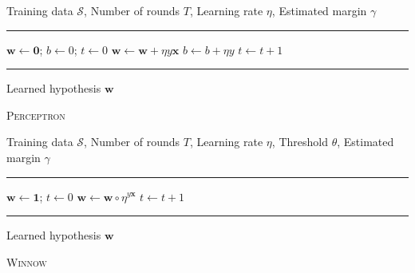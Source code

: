 \documentclass[12pt,letterpaper]{article}
\begin{document}
\begin{enumerate}
\begin{algorithm}[h]
\begin{algorithmic}
    Training data $\mathcal{S}$, Number of rounds $T$, Learning rate $\eta$, Estimated margin $\gamma$
   \vspace{0.5em}
   \hrule
   \vspace{0.5em}
   \STATE $\mathbf{w} \leftarrow \mathbf{0}$; $b \leftarrow 0$; $t \leftarrow 0$
            \STATE $\mathbf{w} \leftarrow \mathbf{w} + \eta y \mathbf{x}$
            \STATE $b \leftarrow b + \eta y$
         \ENDIF
      \ENDFOR
      \STATE $t \leftarrow t + 1$
   \ENDWHILE
   \vspace{0.5em}
   \hrule
   \vspace{0.5em}
    Learned hypothesis $\mathbf{w}$ 
\caption{\textsc{Perceptron}}
\end{algorithmic}
\end{algorithm}

\begin{algorithm}[h]
\begin{algorithmic}
    Training data $\mathcal{S}$, Number of rounds $T$, Learning rate $\eta$,  Threshold $\theta$, Estimated margin $\gamma$
   \vspace{0.5em}
   \hrule
   \vspace{0.5em}
   \STATE $\mathbf{w} \leftarrow \mathbf{1}$; $t \leftarrow 0$
            \STATE $\mathbf{w} \leftarrow \mathbf{w} \circ \eta^{y \mathbf{x}}$
         \ENDIF
      \ENDFOR
      \STATE $t \leftarrow t + 1$
   \ENDWHILE
   \vspace{0.5em}
   \hrule
   \vspace{0.5em}
    Learned hypothesis $\mathbf{w}$ 
\caption{\textsc{Winnow}}
\label{alg:winnow}
\end{algorithmic}
\end{algorithm}


\end{enumerate}
\end{document}
